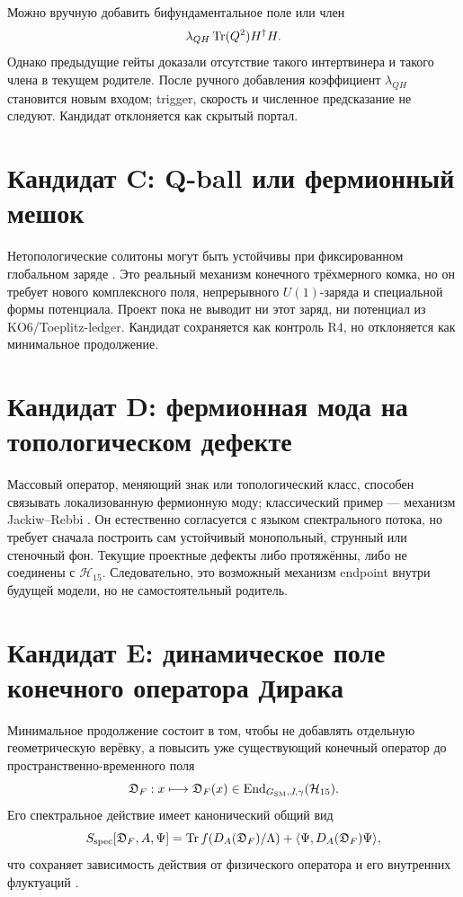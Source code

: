 Можно вручную добавить бифундаментальное поле или член
\begin{equation}
 \lambda_{QH}\operatorname{Tr}(Q^2)H^\dagger H.
\end{equation}
Однако предыдущие гейты доказали отсутствие такого интертвинера и такого
члена в текущем родителе. После ручного добавления коэффициент
$\lambda_{QH}$ становится новым входом; trigger, скорость и численное
предсказание не следуют. Кандидат отклоняется как скрытый портал.

\section{Кандидат C: Q-ball или фермионный мешок}

Нетопологические солитоны могут быть устойчивы при фиксированном
глобальном заряде \cite{candidate-menu-coleman1985,
candidate-menu-friedberg-lee-sirlin1976}. Это реальный механизм конечного
трёхмерного комка, но он требует нового комплексного поля, непрерывного
$U(1)$-заряда и специальной формы потенциала. Проект пока не выводит ни
этот заряд, ни потенциал из KO6/Toeplitz-ledger. Кандидат сохраняется как
контроль R4, но отклоняется как минимальное продолжение.

\section{Кандидат D: фермионная мода на топологическом дефекте}

Массовый оператор, меняющий знак или топологический класс, способен
связывать локализованную фермионную моду; классический пример --- механизм
Jackiw--Rebbi \cite{candidate-menu-jackiw-rebbi1976}. Он естественно
согласуется с языком спектрального потока, но требует сначала построить
сам устойчивый монопольный, струнный или стеночный фон. Текущие проектные
дефекты либо протяжённы, либо не соединены с $\mathcal H_{15}$.
Следовательно, это возможный механизм endpoint внутри будущей модели,
но не самостоятельный родитель.

\section{Кандидат E: динамическое поле конечного оператора Дирака}

Минимальное продолжение состоит в том, чтобы не добавлять отдельную
геометрическую верёвку, а повысить уже существующий конечный оператор до
пространственно-временного поля
\begin{equation}
 \mathfrak D_F:x\longmapsto \mathfrak D_F(x)
 \in\operatorname{End}_{G_{\rm SM},J,\gamma}(\mathcal H_{15}).
 \label{eq:v6-candidate-menu-dynamical-dirac-field}
\end{equation}
Его спектральное действие имеет канонический общий вид
\begin{equation}
 S_{\rm spec}[\mathfrak D_F,A,\Psi]
 =\operatorname{Tr} f(D_A(\mathfrak D_F)/\Lambda)
 +\langle\Psi,D_A(\mathfrak D_F)\Psi\rangle,
 \label{eq:v6-candidate-menu-spectral-action}
\end{equation}
что сохраняет зависимость действия от физического оператора и его
внутренних флуктуаций \cite{candidate-menu-chamseddine-connes1997}.

